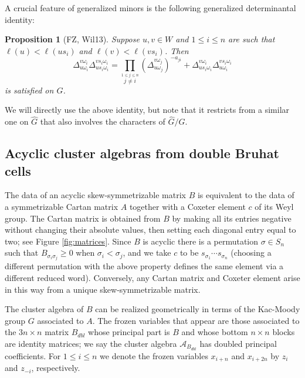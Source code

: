 \documentclass[12pt]{amsart}
\newcommand{\sayHW}[1]{\say[HW]{\color{violet}{\bf HW:}\;#1}}
\newcommand{\cA}{\mathcal{A}}
\newtheorem{proposition}[theorem]{Proposition}
\theoremstyle{remark}
\numberwithin{equation}{section}
\begin{document}
A crucial feature of generalized minors is the following generalized determinantal identity:

\begin{proposition}[FZ, Wil13]
  \label{prop:fundid}
  Suppose $u,v \in W$ and $1 \leq i \leq n$ are such that $\ell(u)<\ell(us_i)$ and $\ell(v)<\ell(vs_i)$. 
  Then 
  \begin{equation}
    \label{eq:fundid}
    \Delta_{u\omega_i}^{v\omega_i} \Delta_{us_i\omega_i}^{vs_i\omega_i} 
    =
    \prod_{\stackrel{1\leq j \leq n}{j\neq i}}\left(\Delta_{u\omega_j}^{v\omega_j}\right)^{-a_{ji}}
    +
    \Delta_{us_i\omega_i}^{v\omega_i} \Delta_{u\omega_i}^{vs_i\omega_i}
  \end{equation}
is satisfied on $G$.
\end{proposition}

We will directly use the above identity, but note that it restricts from a similar one on $\widehat{G}$ that also involves the characters of $\widehat{G}/G$.

\subsection{Acyclic cluster algebras from double Bruhat cells}

The data of an acyclic skew-symmetrizable matrix $B$ is equivalent to the data of a symmetrizable Cartan matrix $A$ together with a Coxeter element $c$ of its Weyl group. The Cartan matrix is obtained from $B$ by making all its entries negative without changing their absolute values, then setting each diagonal entry equal to two; see Figure \ref{fig:matrices}. Since $B$ is acyclic there is a permutation $\sigma \in S_n$ such that $B_{\sigma_i \sigma_j} \geq 0$ when $\sigma_i < \sigma_j$, and we take $c$ to be $s_{\sigma_1} \cdots s_{\sigma_n}$ (choosing a different permutation with the above property defines the same element via a different reduced word). Conversely, any Cartan matrix and Coxeter element arise in this way from a unique skew-symmetrizable matrix.


The cluster algebra of $B$ can be realized geometrically in terms of the Kac-Moody group $G$ associated to $A$. The frozen variables that appear are those associated to the  $3n \times n$ matrix $B_{dbl}$ whose principal part is $B$ and whose bottom $n \times n$ blocks are identity matrices; we say the cluster algebra $\cA_{B_{dbl}}$ has doubled principal coefficients. For $1 \leq i \leq n$ we denote the frozen variables $x_{i+n}$ and $x_{i+2n}$ by $z_i$ and $z_{-i}$, respectively.
\end{document}
